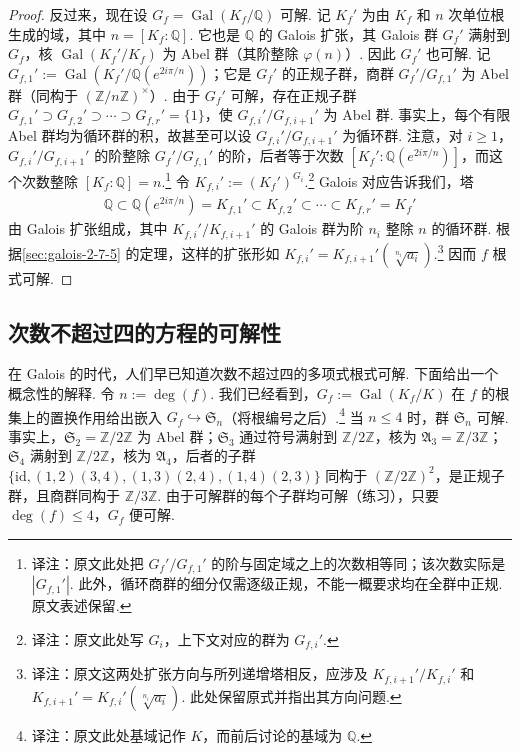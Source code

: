 \begin{proof}
反过来，现在设 $G_f=\operatorname{Gal}(K_f/\mathbb Q)$ 可解. 记 $K_f'$ 为由 $K_f$ 和 $n$ 次单位根生成的域，其中 $n=[K_f:\mathbb Q]$. 它也是 $\mathbb Q$ 的 Galois 扩张，其 Galois 群 $G_f'$ 满射到 $G_f$，核 $\operatorname{Gal}(K_f'/K_f)$ 为 Abel 群（其阶整除 $\varphi(n)$）. 因此 $G_f'$ 也可解. 记 $G_{f,1}':=\operatorname{Gal}(K_f'/\mathbb Q(e^{2i\pi/n}))$；它是 $G_f'$ 的正规子群，商群 $G_f'/G_{f,1}'$ 为 Abel 群（同构于 $(\mathbb Z/n\mathbb Z)^\times$）. 由于 $G_f'$ 可解，存在正规子群 $G_{f,1}'\supset G_{f,2}'\supset\cdots\supset G_{f,r}'=\{1\}$，使 $G_{f,i}'/G_{f,i+1}'$ 为 Abel 群. 事实上，每个有限 Abel 群均为循环群的积，故甚至可以设 $G_{f,i}'/G_{f,i+1}'$ 为循环群. 注意，对 $i\geq1$，$G_{f,i}'/G_{f,i+1}'$ 的阶整除 $G_f'/G_{f,1}'$ 的阶，后者等于次数 $[K_f':\mathbb Q(e^{2i\pi/n})]$，而这个次数整除 $[K_f:\mathbb Q]=n$.\footnote{译注：原文此处把 $G_f'/G_{f,1}'$ 的阶与固定域之上的次数相等同；该次数实际是 $|G_{f,1}'|$. 此外，循环商群的细分仅需逐级正规，不能一概要求均在全群中正规. 原文表述保留.}
令 $K_{f,i}':=(K_f')^{G_i}$.\footnote{译注：原文此处写 $G_i$，上下文对应的群为 $G_{f,i}'$.} Galois 对应告诉我们，塔
\begin{align*}
\mathbb Q\subset\mathbb Q(e^{2i\pi/n})=K_{f,1}'\subset K_{f,2}'\subset\cdots\subset K_{f,r}'=K_f'
\end{align*}
由 Galois 扩张组成，其中 $K_{f,i}'/K_{f,i+1}'$ 的 Galois 群为阶 $n_i$ 整除 $n$ 的循环群. 根据\ref{sec:galois-2-7-5} 的定理，这样的扩张形如 $K_{f,i}'=K_{f,i+1}'(\sqrt[n_i]{a_i})$.\footnote{译注：原文这两处扩张方向与所列递增塔相反，应涉及 $K_{f,i+1}'/K_{f,i}'$ 和 $K_{f,i+1}'=K_{f,i}'(\sqrt[n_i]{a_i})$. 此处保留原式并指出其方向问题.} 因而 $f$ 根式可解.
\end{proof}
\subsection{次数不超过四的方程的可解性}\label{sec:galois-2-8-3}
在 Galois 的时代，人们早已知道次数不超过四的多项式根式可解. 下面给出一个概念性的解释. 令 $n:=\deg(f)$. 我们已经看到，$G_f:=\operatorname{Gal}(K_f/K)$ 在 $f$ 的根集上的置换作用给出嵌入 $G_f\hookrightarrow\mathfrak S_n$（将根编号之后）.\footnote{译注：原文此处基域记作 $K$，而前后讨论的基域为 $\mathbb Q$.} 当 $n\leq4$ 时，群 $\mathfrak S_n$ 可解. 事实上，$\mathfrak S_2=\mathbb Z/2\mathbb Z$ 为 Abel 群；$\mathfrak S_3$ 通过符号满射到 $\mathbb Z/2\mathbb Z$，核为 $\mathfrak A_3=\mathbb Z/3\mathbb Z$；$\mathfrak S_4$ 满射到 $\mathbb Z/2\mathbb Z$，核为 $\mathfrak A_4$，后者的子群 $\{\mathrm{id},(1,2)(3,4),(1,3)(2,4),(1,4)(2,3)\}$ 同构于 $(\mathbb Z/2\mathbb Z)^2$，是正规子群，且商群同构于 $\mathbb Z/3\mathbb Z$. 由于可解群的每个子群均可解（练习），只要 $\deg(f)\leq4$，$G_f$ 便可解.
